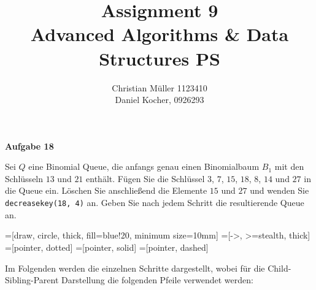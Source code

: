 \documentclass{article}
\begin{document}
\title{Assignment 9 \\ Advanced Algorithms \& Data Structures PS}%
\author{Christian Müller 1123410 \\ Daniel Kocher, 0926293}%
\maketitle

{\bfseries Aufgabe 18}%

Sei $Q$ eine Binomial Queue, die anfangs genau einen Binomialbaum $B_1$ mit den
Schl{\"u}sseln $13$ und $21$ enth{\"a}lt. F{\"u}gen Sie die Schl{\"u}ssel $3$,
$7$, $15$, $18$, $8$, $14$ und $27$ in die Queue ein. L{\"o}schen Sie
anschlie{\ss}end die Elemente $15$ und $27$ und wenden Sie
\texttt{decreasekey(18, 4)} an. Geben Sie nach jedem Schritt die resultierende
Queue an.

=[draw, circle, thick, fill=blue!20, minimum size=10mm]
=[->, >=stealth, thick]
=[pointer, dotted]
=[pointer, solid]
=[pointer, dashed]

Im Folgenden werden die einzelnen Schritte dargestellt, wobei f{\"u}r die
Child-Sibling-Parent Darstellung die folgenden Pfeile verwendet werden:
\begin{figure}[H]
  \centering
\end{figure}
\end{document}
